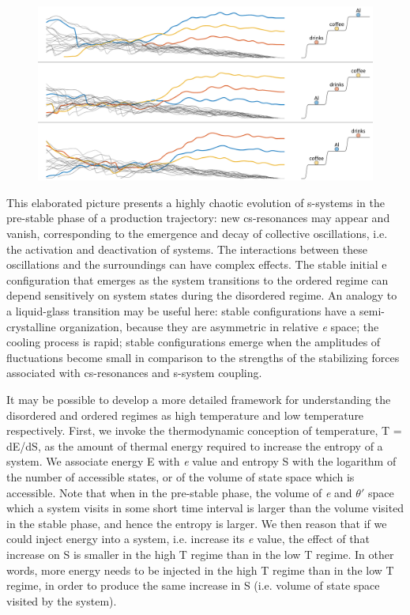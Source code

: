    
\begin{figure}
\includegraphics[width=\textwidth]{figures/Tilsen-img77.png}
\caption{\missingcaption}
\label{fig:4:27}
\end{figure}
 

  This elaborated picture presents a highly chaotic evolution of s-systems in the pre-stable phase of a production trajectory: new cs-resonances may appear and vanish, corresponding to the emergence and decay of collective oscillations, i.e. the activation and deactivation of systems. The interactions between these oscillations and the surroundings can have complex effects. The stable initial e configuration that emerges as the system transitions to the ordered regime can depend sensitively on system states during the disordered regime. An analogy to a liquid-glass transition may be useful here: stable configurations have a semi-crystalline organization, because they are asymmetric in relative \textit{e} space; the cooling process is rapid; stable configurations emerge when the amplitudes of fluctuations become small in comparison to the strengths of the stabilizing forces associated with cs-resonances and s-system coupling.

  It may be possible to develop a more detailed framework for understanding the disordered and ordered regimes as high temperature and low temperature respectively. First, we invoke the thermodynamic conception of temperature, T = dE/dS, as the amount of thermal energy required to increase the entropy of a system. We associate energy E with \textit{e} value and entropy S with the logarithm of the number of accessible states, or of the volume of state space which is accessible. Note that when in the pre-stable phase, the volume of \textit{e} and $\theta ′$ space which a system visits in some short time interval is larger than the volume visited in the stable phase, and hence the entropy is larger. We then reason that if we could inject energy into a system, i.e. increase its \textit{e} value, the effect of that increase on S is smaller in the high T regime than in the low T regime. In other words, more energy needs to be injected in the high T regime than in the low T regime, in order to produce the same increase in S (i.e. volume of state space visited by the system).

